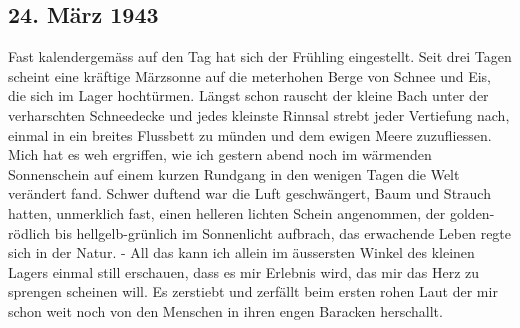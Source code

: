 \subsection{24. M\"{a}rz 1943}

Fast kalendergem\"{a}ss auf den Tag hat sich der Fr\"{u}hling eingestellt.
Seit drei Tagen scheint eine kr\"{a}ftige M\"{a}rzsonne auf die meterhohen Berge von Schnee und Eis, die sich im Lager hocht\"{u}rmen.
L\"{a}ngst schon rauscht der kleine Bach unter der verharschten Schneedecke und jedes kleinste Rinnsal strebt jeder Vertiefung nach, einmal in ein breites Flussbett zu m\"{u}nden und dem ewigen Meere zuzufliessen.
Mich hat es weh ergriffen, wie ich gestern abend noch im w\"{a}rmenden Sonnenschein auf einem kurzen Rundgang in den wenigen Tagen die Welt ver\"{a}ndert fand.
Schwer duftend war die Luft geschw\"{a}ngert, Baum und Strauch hatten, unmerklich fast, einen helleren lichten Schein angenommen, der golden-r\"{o}dlich bis hellgelb-gr\"{u}nlich im Sonnenlicht aufbrach, das erwachende Leben regte sich in der Natur.
- All das kann ich allein im \"{a}ussersten Winkel des kleinen Lagers einmal still erschauen, dass es mir Erlebnis wird, das mir das Herz zu sprengen scheinen will.
Es zerstiebt und zerf\"{a}llt beim ersten rohen Laut der mir schon weit noch von den Menschen in ihren engen Baracken herschallt.


\clearpage

